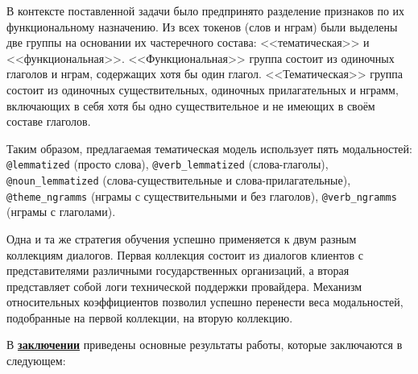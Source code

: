 В контексте поставленной задачи было предпринято разделение признаков по их функциональному назначению. Из всех токенов (слов и нграм) были выделены две группы на основании их частеречного состава: <<тематическая>> и <<функциональная>>. <<Функциональная>> группа состоит из одиночных глаголов и нграм, содержащих хотя бы один глагол. <<Тематическая>> группа состоит из одиночных существительных, одиночных прилагательных и нграмм, включающих в себя хотя бы одно существительное и не имеющих в своём составе глаголов.

Таким образом, предлагаемая тематическая модель использует пять модальностей: \texttt{@lemmatized} (просто слова), \texttt{@verb\_lemmatized} (слова-глаголы), \texttt{@noun\_lemmatized} (слова-существительные и слова-прилагательные), \texttt{@theme\_ngramms} (нграмы с существительными и без глаголов), \texttt{@verb\_ngramms} (нграмы с глаголами).



Одна и та же стратегия обучения успешно применяется к двум разным коллекциям диалогов. Первая коллекция состоит из диалогов клиентов с представителями различными государственных организаций, а вторая представляет собой логи технической поддержки провайдера. Механизм относительных коэффициентов позволил успешно перенести веса модальностей, подобранные на первой коллекции, на вторую коллекцию.


\FloatBarrier
{}                                  %
В \underline{\textbf{заключении}} приведены основные результаты работы, которые заключаются в следующем:




